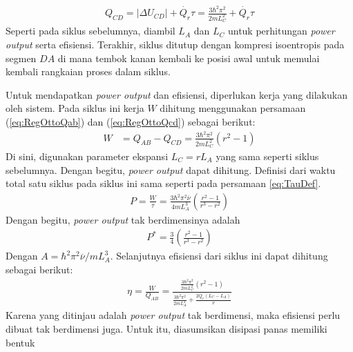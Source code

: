 \begin{align}
    Q_{CD} = |\Delta U_{CD}| + \dot{Q_r}\tau = \frac{3\hbar^2\pi^2}{2mL_C^2} + \dot{Q_r}\tau \label{eq:RegOttoQcd}
\end{align}
Seperti pada siklus sebelumnya, diambil \(L_A\) dan \(L_C\) untuk perhitungan \textit{power output} serta efisiensi. Terakhir, siklus ditutup dengan kompresi isoentropis pada segmen \(DA\) di mana tembok kanan kembali ke posisi awal untuk memulai kembali rangkaian proses dalam siklus.
\par Untuk mendapatkan \textit{power output} dan efisiensi, diperlukan kerja yang dilakukan oleh sistem. Pada siklus ini kerja \(W\) dihitung menggunakan persamaan (\ref{eq:RegOttoQab}) dan (\ref{eq:RegOttoQcd}) sebagai berikut:
\begin{align}
    W &= Q_{AB} - Q_{CD} = \frac{3\hbar^2\pi^2}{2mL_C^2}(r^2 - 1)
\end{align}
Di sini, digunakan parameter ekspansi \(L_C = rL_A\) yang sama seperti siklus sebelumnya. Dengan begitu, \textit{power output} dapat dihitung. Definisi dari waktu total satu siklus pada siklus ini sama seperti pada persamaan \ref{eq:TauDef}.
\begin{align}
    P = \frac{W}{\tau} = \frac{3\hbar^2\pi^2\overline{\nu}}{4mL_A^3}\left(\frac{r^2 - 1}{r^3 - r^2}\right) 
\end{align}
Dengan begitu, \textit{power output} tak berdimensinya adalah
\begin{align}
    P^* = \frac{3}{4}\left(\frac{r^2 - 1}{r^3 - r^2}\right)
\end{align}
Dengan \(A = \hbar^2\pi^2\overline{\nu}/mL_A^3\). Selanjutnya efisiensi dari siklus ini dapat dihitung sebagai berikut:
\begin{align}
    \eta = \frac{W}{Q_{AB}} = \frac{\frac{3\hbar^2\pi^2}{2mL_C^2}(r^2 - 1)}{\frac{3\hbar^2\pi^2}{2mL_A^2} + \frac{2\dot{Q_r}(L_C - L_A)}{\overline{\nu}}}
\end{align}
Karena yang ditinjau adalah \textit{power output} tak berdimensi, maka efisiensi perlu dibuat tak berdimensi juga. Untuk itu, diasumsikan disipasi panas memiliki bentuk
